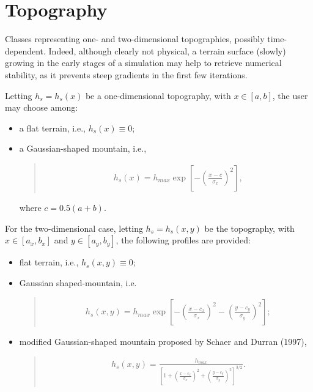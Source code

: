 \documentclass[letterpaper,10pt,english]{sphinxmanual}
\begin{document}
\section{Topography}
\label{\detokenize{api:topography}}\label{\detokenize{api:module-tasmania.grids.topography}}
Classes representing one- and two-dimensional topographies, possibly time-dependent.
Indeed, although clearly not physical, a terrain surface (slowly) growing in the early stages
of a simulation may help to retrieve numerical stability, as it prevents steep gradients
in the first few iterations.

Letting \(h_s = h_s(x)\) be a one-dimensional topography, with \(x \in [a,b]\),
the user may choose among:
\begin{itemize}
\item {} 
a flat terrain, i.e., \(h_s(x) \equiv 0\);

\item {} 
a Gaussian-shaped mountain, i.e.,
\begin{quote}
\begin{equation*}
\begin{split}h_s(x) = h_{max} \exp{\left[ - \left( \frac{x - c}{\sigma_x} \right)^2 \right]},\end{split}
\end{equation*}\end{quote}

where \(c = 0.5 (a + b)\).

\end{itemize}

For the two-dimensional case, letting \(h_s = h_s(x,y)\) be the topography, with
\(x \in [a_x,b_x]\) and \(y \in [a_y,b_y]\), the following profiles are provided:
\begin{itemize}
\item {} 
flat terrain, i.e., \(h_s(x,y) \equiv 0\);

\item {} 
Gaussian shaped-mountain, i.e.
\begin{quote}
\begin{equation*}
\begin{split}h_s(x,y) = h_{max} \exp{\left[ - \left( \frac{x - c_x}{\sigma_x} \right)^2 - \left( \frac{y - c_y}{\sigma_y} \right)^2 \right]} ;\end{split}
\end{equation*}\end{quote}

\item {} 
modified Gaussian-shaped mountain proposed by Schaer and Durran (1997),
\begin{quote}
\begin{equation*}
\begin{split}h_s(x,y) = \frac{h_{max}}{\left[ 1 + \left( \frac{x - c_x}{\sigma_x} \right)^2 + \left( \frac{y - c_y}{\sigma_y} \right)^2 \right]^{3/2}}.\end{split}
\end{equation*}\end{quote}

\end{itemize}
\end{document}
